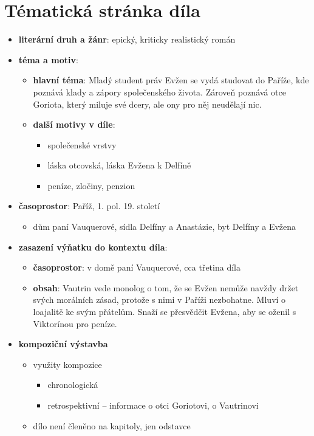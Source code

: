 \documentclass[10pt,a4paper]{article}
\begin{document}
\section*{Tématická stránka díla}
\begin{itemize}
\item \textbf{literární druh a žánr}: epický, kriticky realistický román
\item \textbf{téma a motiv}: 
	\begin{itemize}
\item \textbf{hlavní téma}: Mladý student práv Evžen se vydá studovat do Paříže, kde poznává klady a zápory společenského života. Zároveň poznává otce Goriota, který miluje své dcery, ale ony pro něj neudělají nic.
	\item \textbf{další motivy v díle}: 
		\begin{itemize}
		\item společenské vrstvy
		\item láska otcovská, láska Evžena k Delfíně
		\item peníze, zločiny, penzion
		\end{itemize}
	\end{itemize}
\item \textbf{časoprostor}: Paříž, 1. pol. 19. století
	\begin{itemize}
	\item dům paní Vauquerové, sídla Delfíny a Anastázie, byt Delfíny a Evžena
	\end{itemize}
\item \textbf{zasazení výňatku do kontextu díla}:
	\begin{itemize}
	\item \textbf{časoprostor}: v domě paní Vauquerové, cca třetina díla
	\item \textbf{obsah}: Vautrin vede monolog o tom, že se Evžen nemůže navždy držet svých morálních zásad, protože s nimi v Paříži nezbohatne. Mluví o loajalitě ke svým přátelům. Snaží se přesvědčit Evžena, aby se oženil s Viktorínou pro peníze.
	\end{itemize}
\item \textbf{kompoziční výstavba}
	\begin{itemize}
	\item využity kompozice
		\begin{itemize}
		\item chronologická 
		\item retrospektivní -- informace o otci Goriotovi, o Vautrinovi
		\end{itemize}
	\item dílo není členěno na kapitoly, jen odstavce
	\end{itemize}
\end{itemize}
\end{document}
